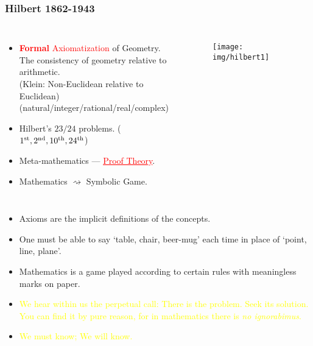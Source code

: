 \documentclass[UTF8,11pt,colorlinks,compress,openany]{beamer}%
\begin{document}
\begin{frame}\frametitle{Hilbert 1862-1943}
	\begin{columns}[onlytextwidth]
	\begin{itemize}
		\item \textcolor{red}{\textbf{Formal} Axiomatization} of Geometry.\\
		The consistency of geometry relative to arithmetic.\\
		(Klein: Non-Euclidean relative to Euclidean)\\
		(natural/integer/rational/real/complex)
		\item Hilbert's $23/24$ problems. ($1\textsuperscript{st}, 2\textsuperscript{nd}, 10\textsuperscript{th}, 24\textsuperscript{th}$)
		\item Meta-mathematics --- \textcolor{red}{\underline{Proof Theory}}.
		\item \textcolor{red}{} Mathematics $\rightsquigarrow$ Symbolic Game.
	\end{itemize}
			\begin{figure}
				\texttt{[image: img/hilbert1]}
			\end{figure}
	\end{columns}
		\begin{block}{}
			\begin{itemize}\small
			\item Axioms are the implicit definitions of the concepts.
			\item One must be able to say `table, chair, beer-mug' each time in place of `point, line, plane'.
			\item Mathematics is a game played according to certain rules with meaningless marks on paper.
			\item \textcolor{yellow}{We hear within us the perpetual call: There is the problem. Seek its solution. You can find it by pure reason, for in mathematics there is \emph{no ignorabimus}.}
			\item \textcolor{yellow}{We must know; We will know.}
			\end{itemize}
		\end{block}
\end{frame}
\end{document}

